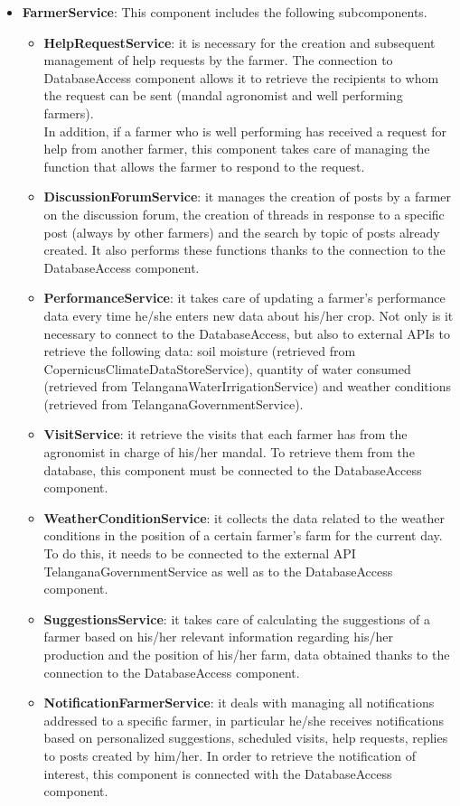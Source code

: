 \begin{itemize}
\item \textbf{FarmerService}: This component includes the following subcomponents.

\begin{itemize}
    \item \textbf{HelpRequestService}: it is necessary for the creation and subsequent management of help requests by the farmer. The connection to DatabaseAccess component allows it to retrieve the recipients to whom the request can be sent (mandal agronomist and well performing farmers).\\
    In addition, if a farmer who is well performing has received a request for help from another farmer, this component takes care of managing the function that allows the farmer to respond to the request.
    \item \textbf{DiscussionForumService}: it manages the creation of posts by a farmer on the discussion forum, the creation of threads in response to a specific post (always by other farmers) and the search by topic of posts already created. It also performs these functions thanks to the connection to the DatabaseAccess component.
    \item \textbf{PerformanceService}: it takes care of updating a farmer's performance data every time he/she  enters new data about his/her crop. Not only is it necessary to connect to the DatabaseAccess, but also to external APIs to retrieve the following data: soil moisture (retrieved from CopernicusClimateDataStoreService), quantity of water consumed (retrieved from TelanganaWaterIrrigationService) and weather conditions (retrieved from TelanganaGovernmentService).
    \item \textbf{VisitService}: it retrieve the visits that each farmer has from the agronomist in charge of his/her mandal. To retrieve them from the database, this component must be connected to the DatabaseAccess component.
    \item \textbf{WeatherConditionService}: it collects the data related to the weather conditions in the position of a certain farmer's farm for the current day. To do this, it needs to be connected to the external API TelanganaGovernmentService as well as to the DatabaseAccess component.
    \item \textbf{SuggestionsService}: it takes care of calculating the suggestions of a farmer based on his/her relevant information regarding his/her production and the position of his/her farm, data obtained thanks to the connection to the DatabaseAccess component.
    \item \textbf{NotificationFarmerService}: it deals with managing all notifications addressed to a specific farmer, in particular he/she receives notifications based on personalized suggestions, scheduled visits, help requests, replies to posts created by him/her. In order to retrieve the notification of interest, this component is connected with the DatabaseAccess component.
\end{itemize}


\end{itemize}
